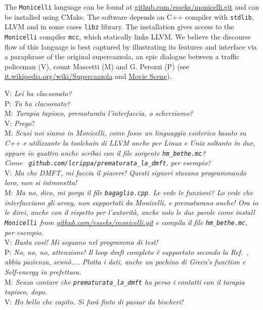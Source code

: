 \documentclass[edipack_sp.tex]{subfiles}
\begin{document}
The {\tt Monicelli} language can be found at
\href{https://github.com/esseks/monicelli.git}{github.com/esseks/monicelli.git}
and can be installed using CMake. The software depends on C++
compiler with {\tt stdlib}, LLVM and in some cases {\tt libz} library. The installation gives access to the {\tt
  Monicelli} compiler {\tt mcc}, which statically links LLVM. 
We believe the discourse flow of this language is best captured by 
illustrating its features and \NAME interface via a paraphrase of the original supercazzola, an epic dialogue between a traffic policeman (V), count Mascetti (M) and G. Perozzi (P) (see
\href{https://it.wikipedia.org/wiki/Supercazzola#Origine}{it.wikipedia.org/wiki/Supercazzola}
and \href{https://www.youtube.com/watch?v=SF8YUFdP6eU}{Movie Scene}). 

\noindent
V: {\it Lei ha clacsonato?}\\
P: {\it Tu ha clacsonato?}\\
M: {\it Tarapia tapioco, prematurata l'interfaccia, o scherziamo?}\\
V: {\it Prego}?\\
M: {\it Scusi noi siamo in Monicelli, come fosse un linguaggio esoterico
basato su C++ e utilizzante la toolchain di LLVM anche per Linux e
Unix soltanto in due, oppure in quattro anche scribai con il file
sorgente {\tt hm\_bethe.mc}? \\ Come {\tt
  github.com/lcrippa/prematurata\_la\_dmft}, per esempio?}\\
V: {\it Ma che DMFT, mi faccia il piacere! Questi signori stavano
programmando loro, non si intrometta!}\\
M: {\it Ma no, dico, mi porga il file {\tt bagaglio.cpp}. Le vede le
funzioni? Lo vede che interfacciano gli array, non supportati da
Monicelli, e prematurano anche! 
Ora io le direi, anche con il rispetto per l'autorità, anche solo le
due parole come install {\tt Monicelli} from
\href{https://github.com/esseks/monicelli.git}{github.com/esseks/monicelli.git}
e compila il file {\tt hm\_bethe.mc}, per esempio.}\\
V: {\it Basta così! Mi seguano nel programma di test!}\\
P: {\it No, no, no, attenzione! Il loop dmft completo \`e supportato
secondo la Ref.~, abbia pazienza,
senn\`o.... Plotta i dati, anche un pochino di Green's function e
Self-energy in prefettura.}\\
M: {\it Senza contare che {\tt prematurata\_la\_dmft} ha perso i contatti con il tarapia tapioco, dopo.}\\
V: {\it Ho bello che capito. Si farà finta di passar da bischeri!}\\
\end{document}
